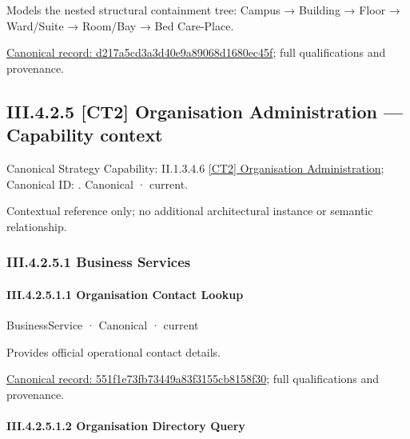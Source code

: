 Models the nested structural containment tree: Campus → Building → Floor → Ward/Suite → Room/Bay → Bed Care-Place.


{\footnotesize \href{../../../../../../../continuum/business/business-function/d217a5cd3a3d40e9a89068d1680ec45f.md}{Canonical record: d217a5cd3a3d40e9a89068d1680ec45f}; full qualifications and provenance.}\par
\subsection*{III.4.2.5 [CT2] Organisation Administration — Capability context}
\label{navigation:III.4.2.5}

{\small Canonical Strategy Capability: II.1.3.4.6 \hyperref[element:14fbdc5ce3dd4c2092c5397dab3ed743]{[CT2] Organisation Administration}; Canonical ID: \texttt{}. Canonical · current.}\par
Contextual reference only; no additional architectural instance or semantic relationship.\par
\subsubsection*{III.4.2.5.1 Business Services}
\label{navigation:III.4.2.5.1}

\paragraph*{III.4.2.5.1.1 Organisation Contact Lookup}
\label{navigation:III.4.2.5.1.1}

\label{element:551f1e73fb73449a83f3155cb8158f30}
{\small BusinessService · Canonical · current}\par

Provides official operational contact details.


{\footnotesize \href{../../../../../../../continuum/business/business-service/551f1e73fb73449a83f3155cb8158f30.md}{Canonical record: 551f1e73fb73449a83f3155cb8158f30}; full qualifications and provenance.}\par
\paragraph*{III.4.2.5.1.2 Organisation Directory Query}
\label{navigation:III.4.2.5.1.2}

